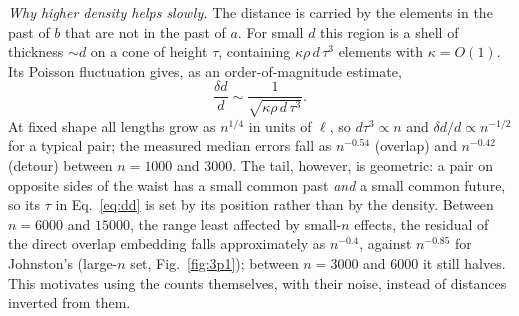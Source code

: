 \documentclass[prd,twocolumn,superscriptaddress,nofootinbib,amsmath,amssymb,floatfix]{revtex4-2}
\begin{document}
\emph{Why higher density helps slowly.} The distance is carried by the elements in the past of $b$ that are not in the past of $a$. For small $d$ this region is a shell of thickness $\sim d$ on a cone of height $\tau$, containing $\kappa\rho\,d\,\tau^3$ elements with $\kappa=O(1)$. Its Poisson fluctuation gives, as an order-of-magnitude estimate,
\begin{equation}
\frac{\delta d}{d}\sim\frac{1}{\sqrt{\kappa\rho\,d\,\tau^3}}.
\label{eq:dd}
\end{equation}
At fixed shape all lengths grow as $n^{1/4}$ in units of $\ell$, so $d\tau^3\propto n$ and $\delta d/d\propto n^{-1/2}$ for a typical pair; the measured median errors fall as $n^{-0.54}$ (overlap) and $n^{-0.42}$ (detour) between $n=1000$ and $3000$. The tail, however, is geometric: a pair on opposite sides of the waist has a small common past \emph{and} a small common future, so its $\tau$ in Eq.~\eqref{eq:dd} is set by its position rather than by the density. Between $n=6000$ and $15000$, the range least affected by small-$n$ effects, the residual of the direct overlap embedding falls approximately as $n^{-0.4}$, against $n^{-0.85}$ for Johnston's (large-$n$ set, Fig.~\ref{fig:3p1}); between $n=3000$ and $6000$ it still halves. This motivates using the counts themselves, with their noise, instead of distances inverted from them.
\end{document}

